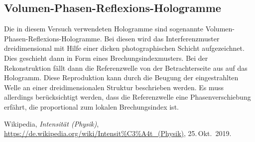 \documentclass[german,  %
parskip=full,  %
]{scrartcl}
\begin{document}
\subsection{Volumen-Phasen-Reflexions-Hologramme}
Die in diesem Versuch verwendeten Hologramme sind sogenannte Volumen-Phasen-Reflexions-Hologramme. Bei diesen wird das Interferenzmuster dreidimensional mit Hilfe einer dicken photographischen Schicht aufgezeichnet. Dies geschieht dann in Form eines Brechungsindexmusters. 
\newline
Bei der Rekonstruktion fällt dann die Referenzwelle von der Betrachterseite aus auf das Hologramm. Diese Reproduktion kann durch die Beugung der eingestrahlten Welle an einer dreidimensionalen Struktur beschrieben werden. Es muss allerdings berücksichtigt werden, dass die Referenzwelle eine Phasenverschiebung erfährt, die proportional zum lokalen Brechungsindex ist.

    \begin{thebibliography}{9}
    Wikipedia,
    \emph{Intensität (Physik)},
    \url{https://de.wikipedia.org/wiki/Intensit%C3%A4t_(Physik)},
    25.\,Okt.~2019.
    \end{thebibliography}

\end{document}
